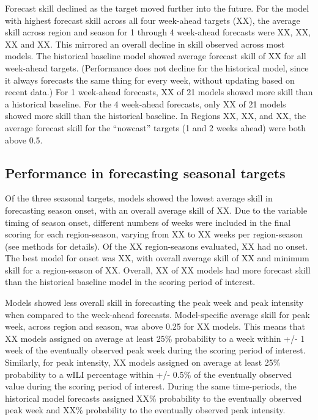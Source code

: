 \documentclass{article}
\begin{document}
Forecast skill declined as the target moved further into the future.
For the model with highest forecast skill across all four week-ahead targets (XX), the average skill across region and season for 1 through 4 week-ahead forecasts were XX, XX, XX and XX.
This mirrored an overall decline in skill observed across most models.
The historical baseline model showed average forecast skill of XX for all week-ahead targets. (Performance does not decline for the historical model, since it always forecasts the same thing for every week, without updating based on recent data.)
For 1 week-ahead forecasts, XX of 21 models showed more skill than a historical baseline. 
For the 4 week-ahead forecasts, only XX of 21 models showed more skill than the historical baseline.
In Regions XX, XX, and XX, the average forecast skill for the ``nowcast'' targets (1 and 2 weeks ahead) were both above 0.5.


\subsection{Performance in forecasting seasonal targets}

Of the three seasonal targets, models showed the lowest average skill in forecasting season onset, with an overall average skill of XX. 
Due to the variable timing of season onset, different numbers of weeks were included in the final scoring for each region-season, varying from XX to XX weeks per region-season (see methods for details).
Of the XX region-seasons evaluated, XX had no onset. 
The best model for onset was XX, with overall average skill of XX and minimum skill for a region-season of XX.
Overall, XX of XX models had more forecast skill than the historical baseline model in the scoring period of interest.


Models showed less overall skill in forecasting the peak week and peak intensity when compared to the week-ahead forecasts.
Model-specific average skill for peak week, across region and season, was above 0.25 for XX models. 
This means that XX models assigned on average at least 25\% probability to a week within +/- 1 week of the eventually observed peak week during the scoring period of interest.
Similarly, for peak intensity, XX models assigned on average at least 25\% probability to a wILI percentage within +/- 0.5\% of the eventually observed value during the scoring period of interest.
During the same time-periods, the historical model forecasts assigned XX\% probability to the eventually observed peak week and XX\% probability to the eventually observed peak intensity.
\end{document}

